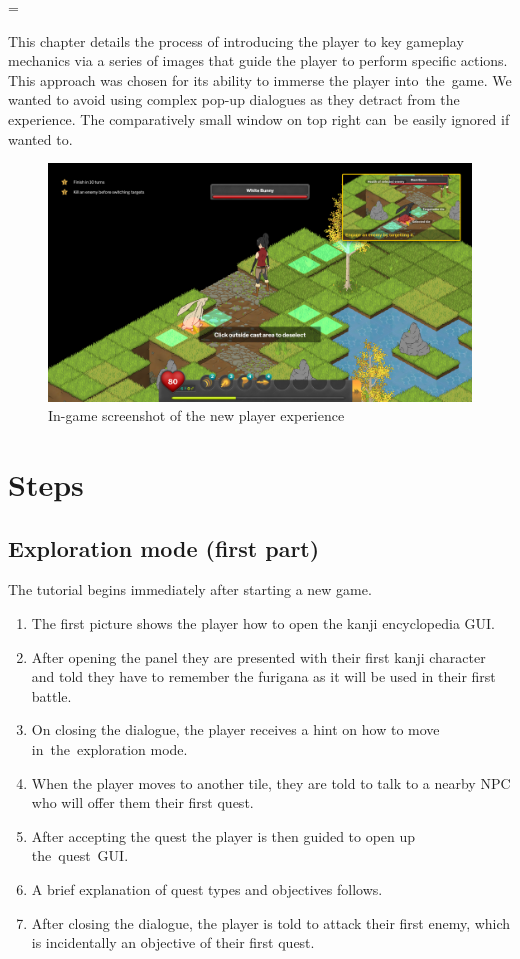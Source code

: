 \documentclass[thesis=B,english,hidelinks]{FITthesisXE}[2012/06/26]
\begin{document}
\emergencystretch=\maxdimen
{}

This chapter details the process of introducing the player to key gameplay mechanics via a series of images that guide the player to perform specific actions. This approach was chosen for its ability to immerse the player into~the~game. We wanted to avoid using complex pop-up dialogues as they detract from the experience. The comparatively small window on top right can~be easily ignored if wanted to.

\begin{figure}[ht]
\centering
\includegraphics[scale=0.2]{tutorial}
\caption{In-game screenshot of the new player experience}
\label{fig:tutorial}
\end{figure}

\section{Steps}

\subsection{Exploration mode (first part)}
The tutorial begins immediately after starting a new game.

\begin{enumerate}
\item The first picture shows the player how to open the kanji encyclopedia GUI.
\item After opening the panel they are presented with their first kanji character and told they have to remember the furigana as it will be used in their first battle.
\item On closing the dialogue, the player receives a hint on how to move in~the~exploration mode.
\item When the player moves to another tile, they are told to talk to a nearby NPC who will offer them their first quest.
\item After accepting the quest the player is then guided to open up the~quest~GUI.
\item A brief explanation of quest types and objectives follows.
\item After closing the dialogue, the player is told to attack their first enemy, which is incidentally an objective of their first quest.
\end{enumerate}
\end{document}

